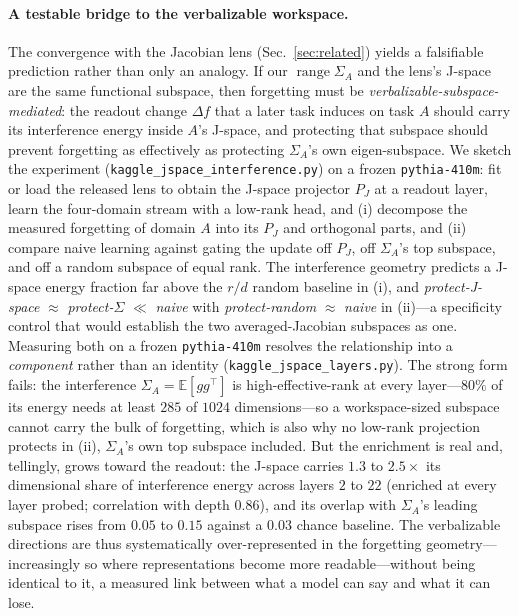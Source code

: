 \documentclass[10pt,a4paper]{article}
\theoremstyle{plain}
\theoremstyle{definition}
\newcommand{\Sig}{\Sigma}
\newcommand{\Del}{\Delta}
\DeclareMathOperator{\range}{range}
\begin{document}
\paragraph{A testable bridge to the verbalizable workspace.} The convergence with the
Jacobian lens (Sec.~\ref{sec:related}) yields a falsifiable prediction rather than only
an analogy. If our $\range\Sig_A$ and the lens's J-space are the same functional
subspace, then forgetting must be \emph{verbalizable-subspace-mediated}: the readout
change $\Del f$ that a later task induces on task $A$ should carry its interference
energy inside $A$'s J-space, and protecting that subspace should prevent forgetting as
effectively as protecting $\Sig_A$'s own eigen-subspace. We sketch the experiment
(\texttt{kaggle\_jspace\_interference.py}) on a frozen \texttt{pythia-410m}: fit or load
the released lens to obtain the J-space projector $P_J$ at a readout layer, learn the
four-domain stream with a low-rank head, and (i) decompose the measured forgetting of
domain $A$ into its $P_J$ and orthogonal parts, and (ii) compare naive learning against
gating the update off $P_J$, off $\Sig_A$'s top subspace, and off a random subspace of
equal rank. The interference geometry predicts a J-space energy fraction far above the
$r/d$ random baseline in (i), and \emph{protect-J-space} $\approx$ \emph{protect-}$\Sig$
$\ll$ \emph{naive} with \emph{protect-random} $\approx$ \emph{naive} in (ii)---a
specificity control that would establish the two averaged-Jacobian subspaces as one.
Measuring both on a frozen \texttt{pythia-410m} resolves the relationship into a
\emph{component} rather than an identity (\texttt{kaggle\_jspace\_layers.py}). The strong
form fails: the interference $\Sig_A=\mathbb{E}[gg^\top]$ is high-effective-rank at every
layer---$80\%$ of its energy needs at least $285$ of $1024$ dimensions---so a
workspace-sized subspace cannot carry the bulk of forgetting, which is also why no
low-rank projection protects in (ii), $\Sig_A$'s own top subspace included. But the
enrichment is real and, tellingly, grows toward the readout: the J-space carries $1.3$ to
$2.5\times$ its dimensional share of interference energy across layers $2$ to $22$
(enriched at every layer probed; correlation with depth $0.86$), and its overlap with
$\Sig_A$'s leading subspace rises from $0.05$ to $0.15$ against a $0.03$ chance baseline.
The verbalizable directions are thus systematically over-represented in the forgetting
geometry---increasingly so where representations become more readable---without being
identical to it, a measured link between what a model can say and what it can lose.
\end{document}
